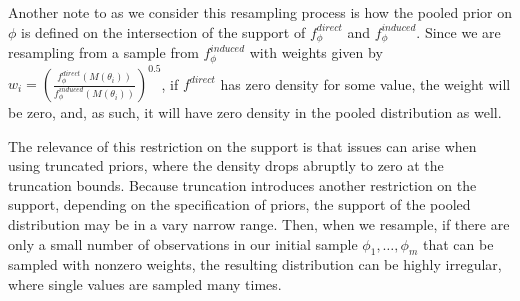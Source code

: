 \documentclass[12pt,twoside]{smiththesis}
\begin{document}
Another note to as we consider this resampling process is how the pooled prior on \(\phi\) is defined on the intersection of the support of \(f_\phi^{direct}\) and \(f_\phi^{induced}\). Since we are resampling from a sample from \(f_\phi^{induced}\) with weights given by
\(w_i = \left( \frac{f_\phi^{direct}(M(\theta_i))}{f_\phi^{induced}(M(\theta_i))} \right)^{0.5}\), if \(f^{direct}\) has zero density for some value, the weight will be zero, and, as such, it will have zero density in the pooled distribution as well.

The relevance of this restriction on the support is that issues can arise when using truncated priors, where the density drops abruptly to zero at the truncation bounds. Because truncation introduces another restriction on the support, depending on the specification of priors, the support of the pooled distribution may be in a vary narrow range. Then, when we resample, if there are only a small number of observations in our initial sample \(\phi_1,\dots,\phi_m\) that can be sampled with nonzero weights, the resulting distribution can be highly irregular, where single values are sampled many times.
\end{document}
